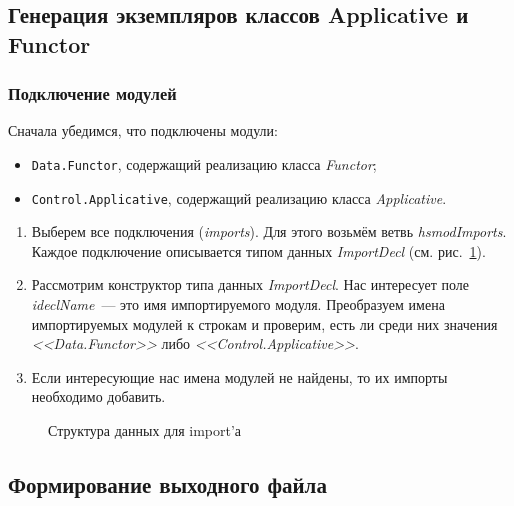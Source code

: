 \subsection{Генерация экземпляров классов Applicative и Functor}
\subsubsection{Подключение модулей}
Сначала убедимся, что подключены модули:
    \begin{itemize}
        \item \lstinline{Data.Functor}, содержащий реализацию класса \textit{Functor};
        \item \lstinline{Control.Applicative}, содержащий реализацию класса \textit{Applicative}.
    \end{itemize}

\begin{enumerate}
\item Выберем все подключения (\textit{imports}). Для этого возьмём ветвь \textit{hsmodImports}. Каждое подключение описывается типом данных \textit{ImportDecl} (см. рис.~\ref{import}).
\item Рассмотрим конструктор типа данных \textit{ImportDecl}. Нас интересует поле \textit{ideclName}~--- это имя импортируемого модуля. Преобразуем имена импортируемых модулей к строкам и проверим, есть ли среди них значения \textit{<<Data.Functor>>} либо \textit{<<Control.Applicative>>}.
\item Если интересующие нас имена модулей не найдены, то их импорты необходимо добавить.
\end{enumerate}

\begin{figure}[h]
\caption{Структура данных для import'а}\label{import}
\end{figure}

\subsection{Формирование выходного файла}
